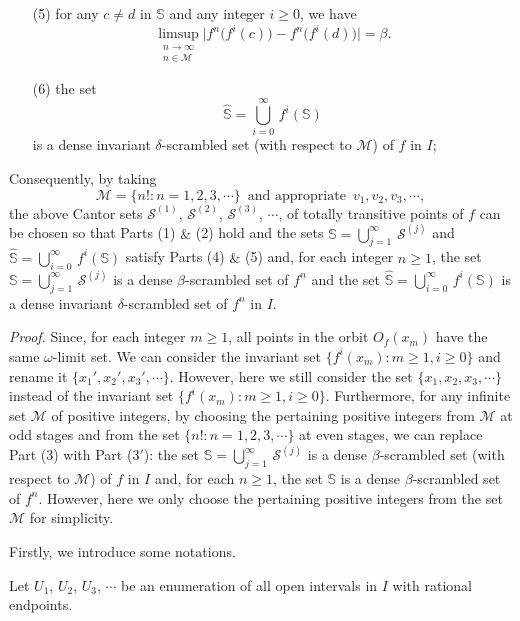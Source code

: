 \documentclass[12pt]{article}
\begin{document}
{\begin{itemize}
\item[{\rm (5)}]
for any $c \ne d$ in $\mathbb S$ and any integer $i \ge 0$, we have 
$$
\limsup_{\substack{n \to \infty \\ n \in \mathcal M}} \big|f^n\big(f^i(c)\big) - f^n\big(f^i(d)\big)\big| = \beta.
$$

\item[{\rm (6)}]
the set $$\widehat {\mathbb S} = \bigcup_{i=0}^{\infty} \, f^i(\mathbb S)$$ is a dense {\rm invariant} $\delta$-scrambled set (with respect to $\mathcal M$) of $f$ in $I$;    
\end{itemize}
Consequently, by taking 
$$
\mathcal M = \{ n!: n = 1, 2, 3, \cdots \} \,\,\, \text{and appropriate} \,\,\, v_1, v_2, v_3, \cdots,
$$ 
the above Cantor sets $\mathcal S^{(1)}$, $\mathcal S^{(2)}$, $\mathcal S^{(3)}$, $\cdots$, of totally transitive points of $f$ can be chosen so that Parts (1) $\&$ (2) hold and the sets $\mathbb S = \bigcup_{j=1}^\infty \, \mathcal S^{(j)}$ and $\widehat {\mathbb S} = \bigcup_{i=0}^\infty \, f^i(\mathbb S)$ satisfy Parts (4) $\&$ (5) and, for each integer $n \ge 1$, the set $\mathbb S = \bigcup_{j=1}^\infty \, \mathcal S^{(j)}$ is a dense $\beta$-scrambled set of $f^n$ and the set $\widehat {\mathbb S} = \bigcup_{i=0}^\infty \, f^i(\mathbb S)$ is a dense {\rm invariant} $\delta$-scrambled set of $f^n$ in $I$.}

\noindent
{\it Proof.}
Since, for each integer $m \ge 1$, all points in the orbit $O_f(x_m)$ have the same $\omega$-limit set.  We can consider the invariant set $\{ f^i(x_m): m \ge 1, i \ge 0 \}$ and rename it $\{ x_1', x_2', x_3', \cdots \}$.  However, here we still consider the set $\{ x_1, x_2, x_3, \cdots \}$ instead of the invariant set $\{ f^i(x_m): m \ge 1, i \ge 0 \}$.  Furthermore, for any infinite set $\mathcal M$ of positive integers, by choosing the pertaining positive integers from $\mathcal M$ at odd stages and from the set $\{ n!: n = 1, 2, 3, \cdots \}$ at even stages, we can replace Part (3) with Part ($3'$): the set $\mathbb S = \bigcup_{j=1}^\infty \, \mathcal S^{(j)}$ is a dense $\beta$-scrambled set (with respect to $\mathcal M$) of $f$ in $I$ and, for each $n \ge 1$, the set $\mathbb S$ is a dense $\beta$-scrambled set of $f^n$.  However, here we only choose the pertaining positive integers from the set $\mathcal M$ for simplicity.
 
Firstly, we introduce some notations.  

Let $U_1$, $U_2$, $U_3$, $\cdots$ be an enumeration of all open intervals in $I$ with rational endpoints.  
\end{document}
